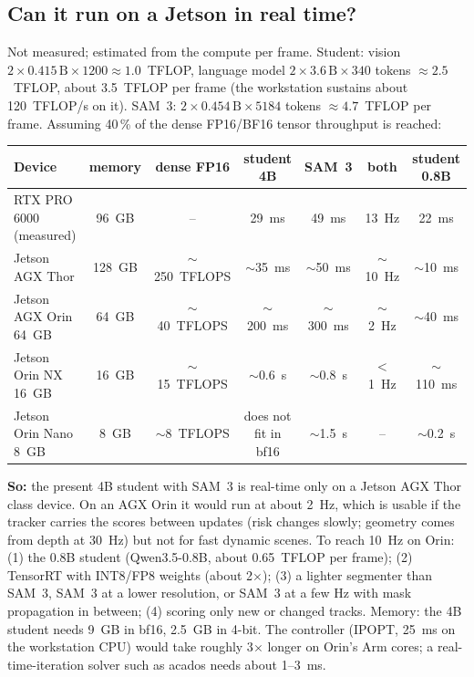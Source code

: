 \documentclass[10pt,a4paper]{article}
\begin{document}
\subsection{Can it run on a Jetson in real time?}
Not measured; estimated from the compute per frame. Student: vision $2\times0.415\,\text{B}\times1200\approx1.0$~TFLOP, language
model $2\times3.6\,\text{B}\times340$ tokens $\approx2.5$~TFLOP, about 3.5~TFLOP per frame (the workstation sustains about
120~TFLOP/s on it). SAM~3: $2\times0.454\,\text{B}\times5184$ tokens $\approx4.7$~TFLOP per frame. Assuming 40\,\% of the dense
FP16/BF16 tensor throughput is reached:

\begin{center}\small
\begin{tabular}{lcccccc}
\toprule
Device & memory & dense FP16 & student 4B & SAM~3 & both & student 0.8B \\
\midrule
RTX PRO 6000 (measured) & 96~GB & -- & 29~ms & 49~ms & 13~Hz & 22~ms \\
Jetson AGX Thor & 128~GB & $\sim$250~TFLOPS & $\sim$35~ms & $\sim$50~ms & $\sim$10~Hz & $\sim$10~ms \\
Jetson AGX Orin 64~GB & 64~GB & $\sim$40~TFLOPS & $\sim$200~ms & $\sim$300~ms & $\sim$2~Hz & $\sim$40~ms \\
Jetson Orin NX 16~GB & 16~GB & $\sim$15~TFLOPS & $\sim$0.6~s & $\sim$0.8~s & $<$1~Hz & $\sim$110~ms \\
Jetson Orin Nano 8~GB & 8~GB & $\sim$8~TFLOPS & does not fit in bf16 & $\sim$1.5~s & -- & $\sim$0.2~s \\
\bottomrule
\end{tabular}
\end{center}
\textbf{So:} the present 4B student with SAM~3 is real-time only on a Jetson AGX Thor class device. On an AGX Orin it would run
at about 2~Hz, which is usable if the tracker carries the scores between updates (risk changes slowly; geometry comes from depth at
30~Hz) but not for fast dynamic scenes. To reach 10~Hz on Orin: (1) the 0.8B student (Qwen3.5-0.8B, about 0.65~TFLOP per frame);
(2) TensorRT with INT8/FP8 weights (about 2$\times$); (3) a lighter segmenter than SAM~3, SAM~3 at a lower resolution, or SAM~3 at
a few Hz with mask propagation in between; (4) scoring only new or changed tracks. Memory: the 4B student needs 9~GB in bf16,
2.5~GB in 4-bit. The controller (IPOPT, 25~ms on the workstation CPU) would take roughly 3$\times$ longer on Orin's Arm cores;
a real-time-iteration solver such as acados needs about 1--3~ms.
\end{document}
